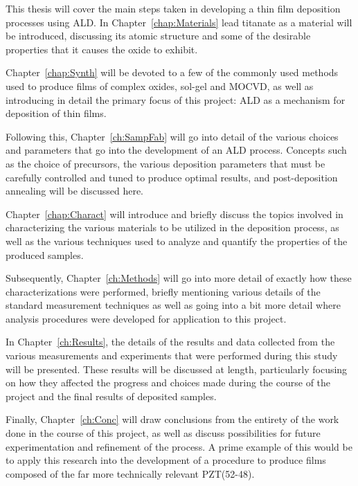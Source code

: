 This thesis will cover the main steps taken in developing a thin film deposition processes using ALD. In Chapter~\ref{chap:Materials} lead titanate as a material will be introduced, discussing its atomic structure and some of the desirable properties that it causes the oxide to exhibit. 

Chapter~\ref{chap:Synth} will be devoted to a few of the commonly used methods used to produce films of complex oxides, sol-gel and MOCVD, as well as introducing in detail the primary focus of this project: ALD as a mechanism for deposition of thin films. 

Following this, Chapter~\ref{ch:SampFab} will go into detail of the various choices and parameters that go into the development of an ALD process. Concepts such as the choice of precursors, the various deposition parameters that must be carefully controlled and tuned to produce optimal results, and post-deposition annealing will be discussed here. 

Chapter~\ref{chap:Charact} will introduce and briefly discuss the topics involved in characterizing the various materials to be utilized in the deposition process, as well as the various techniques used to analyze and quantify the properties of the produced samples. 

Subsequently, Chapter~\ref{ch:Methods} will go into more detail of exactly how these characterizations were performed, briefly mentioning various details of the standard measurement techniques as well as going into a bit more detail where analysis procedures were developed for application to this project. 

In Chapter~\ref{ch:Results}, the details of the results and data collected from the various measurements and experiments that were performed during this study will be presented.  These results will be discussed at length, particularly focusing on how they affected the progress and choices made during the course of the project and the final results of deposited samples. 

Finally, Chapter~\ref{ch:Conc} will draw conclusions from the entirety of the work done in the course of this project, as well as discuss possibilities for future experimentation and refinement of the process. A prime example of this would be to apply this research into the development of a procedure to produce films composed of the far more technically relevant PZT(52-48). 


%
